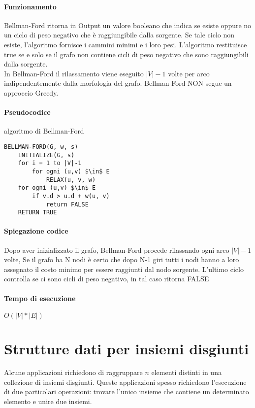 	\paragraph{Funzionamento}
	Bellman-Ford ritorna in Output un valore booleano che indica se esiste oppure no un ciclo di peso
	negativo che è raggiungibile dalla sorgente. Se tale ciclo non esiste, l'algoritmo fornisce i cammini minimi
	e i loro pesi. L'algoritmo restituisce true se e solo se il grafo non contiene cicli di peso negativo che sono
	raggiungibili dalla sorgente.\\
	In Bellman-Ford il rilassamento viene eseguito $|V|-1$ volte per arco indipendentemente dalla morfologia del grafo.
	Bellman-Ford NON segue un approccio Greedy.

	\paragraph{Pseudocodice} algoritmo di Bellman-Ford
	\begin{lstlisting}
BELLMAN-FORD(G, w, s)
    INITIALIZE(G, s)
    for i = 1 to |V|-1
        for ogni (u,v) $\in$ E
            RELAX(u, v, w)
    for ogni (u,v) $\in$ E
        if v.d > u.d + w(u, v)
            return FALSE
    RETURN TRUE
\end{lstlisting}

	\paragraph{Spiegazione codice}
	Dopo aver inizializzato il grafo, Bellman-Ford procede rilassando ogni arco $|V|-1$ volte,
	Se il grafo ha N nodi è certo che dopo N-1 giri tutti i nodi hanno a loro assegnato il costo minimo per essere raggiunti dal nodo sorgente.
	L'ultimo ciclo controlla se ci sono cicli di peso negativo, in tal caso ritorna FALSE

	\paragraph{Tempo di esecuzione}
	\begin{center}
		$O(|V|*|E|)$
	\end{center}

	\section{Strutture dati per insiemi disgiunti}
	Alcune applicazioni richiedono di raggruppare $n$ elementi distinti in una collezione di insiemi disgiunti.
	Queste applicazioni spesso richiedono l'esecuzione di due particolari operazioni: trovare l'unico insieme che contiene un determinato elemento e unire due insiemi.

